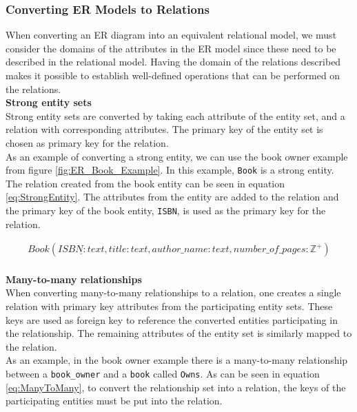 \subsubsection*{Converting ER Models to Relations}
When converting an ER diagram into an equivalent relational model, we must consider the domains of the attributes in the ER model since these need to be described in the relational model. Having the domain of the relations described makes it possible to establish well-defined operations that can be performed on the relations.\\
\textbf{Strong entity sets}\\
Strong entity sets are converted by taking each attribute of the entity set, and a relation with corresponding attributes. 
The primary key of the entity set is chosen as primary key for the relation\cite{DBSBook}.\\
As an example of converting a strong entity, we can use the book owner example from figure \ref{fig:ER_Book_Example}. In this example, \texttt{Book} is a strong entity. The relation created from the book entity can be seen in equation \ref*{eq:StrongEntity}. The attributes from the entity are added to the relation and the primary key of the book entity, \texttt{ISBN}, is used as the primary key for the relation.

\begin{equation}\label{eq:StrongEntity}
    \begin{split}
        Book(\underline{ISBN : text} , title : text , author\_name : text , number\_of\_pages : \mathbb{Z}^+)
    \end{split}
\end{equation}
\\
\textbf{Many-to-many relationships}\\
When converting many-to-many relationships to a relation, one creates a single relation with primary key attributes from the participating entity sets\cite{DBSBook}. These keys are used as foreign key to reference the converted entities participating in the relationship. 
The remaining attributes of the entity set is similarly mapped to the relation.\\
As an example, in the book owner example there is a many-to-many relationship between a \texttt{book\_owner} and a \texttt{book} called \texttt{Owns}. As can be seen in equation \ref{eq:ManyToMany}, to convert the relationship set into a relation, the keys of the participating entities must be put into the relation. 

